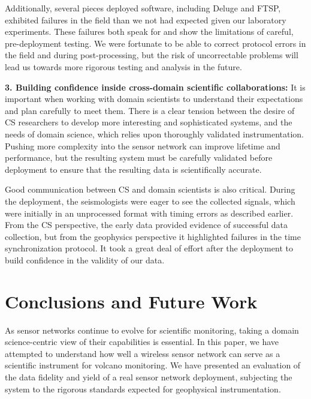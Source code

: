 Additionally, several pieces deployed software, including Deluge and FTSP,
exhibited failures in the field than we not had expected given our laboratory
experiments.  These failures both speak for and show the limitations of
careful, pre-deployment testing.  We were fortunate to be able to correct
protocol errors in the field and during post-processing, but the risk of
uncorrectable problems will lead us towards more rigorous testing and
analysis in the future.

{\bf 3. Building confidence inside cross-domain scientific collaborations:}
It is important when working with domain scientists to understand their
expectations and plan carefully to meet them. There is a clear tension
between the desire of CS researchers to develop more interesting and
sophisticated systems, and the needs of domain science, which relies
upon thoroughly validated instrumentation. Pushing more
complexity into the sensor network can improve lifetime and
performance, but the resulting system must be carefully validated
before deployment to ensure that the resulting data is scientifically
accurate.

Good communication between CS and domain scientists is also critical.  During
the deployment, the seismologists were eager to see the collected signals,
which were initially in an unprocessed format with timing errors as described
earlier. From the CS perspective, the early data provided evidence of
successful data collection, but from the geophysics perspective it
highlighted failures in the time synchronization protocol. It took a great
deal of effort after the deployment to build confidence in the validity of
our data.


\section{Conclusions and Future Work}
\label{evaluation-sec-conclusions}
\label{evaluation-sec-future}
\label{evaluation-sec-futurework}

As sensor networks continue to evolve for scientific monitoring, taking a
domain science-centric view of their capabilities is essential.
In this paper, we have attempted to understand how well a wireless sensor
network can serve as a scientific instrument for volcano monitoring.  We have
presented an evaluation of the data fidelity and yield of a real sensor
network deployment, subjecting the system to the rigorous standards expected
for geophysical instrumentation.

